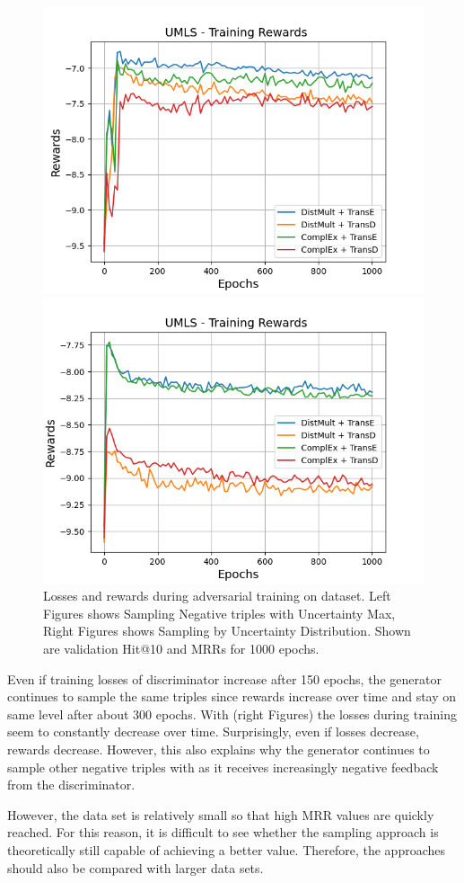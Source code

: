 \begin{figure}
\begin{minipage}{.5\textwidth}
      \includegraphics[width=0.9\linewidth]{figures/results/gan_train/not_pretrained/uncertainty/max/entropy/umls/1k_epochs/uncertainty_umls_rew.png}
    \end{minipage}%
    \begin{minipage}{.5\textwidth}
      \centering
      \includegraphics[width=0.9\linewidth]{figures/results/gan_train/not_pretrained/uncertainty/max_distribution/entropy/umls/1k_epochs/uncertainty_umls_rew.png}
    \end{minipage}%
    \caption{Losses and rewards during adversarial training on \umls dataset. 
    Left Figures shows Sampling Negative triples with Uncertainty Max, Right Figures shows Sampling by Uncertainty Distribution.
    Shown are validation Hit@10 and MRRs for 1000 epochs.}
    \label{fig:advtrain_umls_usmax_ussoftmax_losses_rewards}
\end{figure}
Even if training losses of discriminator increase after 150 epochs, the generator continues to sample the same triples since rewards increase over time and stay on same level after about 300 epochs.
With \ussoftmax (right Figures) the losses during training seem to constantly decrease over time.
Surprisingly, even if losses decrease, rewards decrease.
However, this also explains why the generator continues to sample other negative triples with \ussoftmax as it receives increasingly negative feedback from the discriminator.

However, the \umls data set is relatively small so that high MRR values are quickly reached.
For this reason, it is difficult to see whether the sampling approach is theoretically still capable of achieving a better value.
Therefore, the approaches should also be compared with larger data sets.



